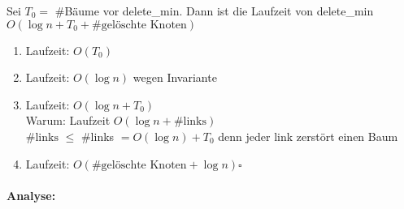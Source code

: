 \Lemma Sei $T_0 =$ \#Bäume vor delete\_min. Dann ist die Laufzeit von delete\_min $O(\log n + T_0+ \text{\#gelöschte Knoten})$
\Bew
\begin{enumerate}
 \item Laufzeit: $O(T_0)$
 \item Laufzeit: $O(\log n)$ wegen Invariante
 \item Laufzeit: $O(\log n + T_0)$\\
         Warum: Laufzeit $O(\log n + \#\text{links})$\\
         $\#\text{links}$ $\leq$ \#links $= O(\log n) + T_0$ denn jeder link zerstört einen Baum
 \item Laufzeit: $O(\text{\#gelöschte Knoten} + \log n)$\hfill$\square$
\end{enumerate}
\paragraph{Analyse:}
